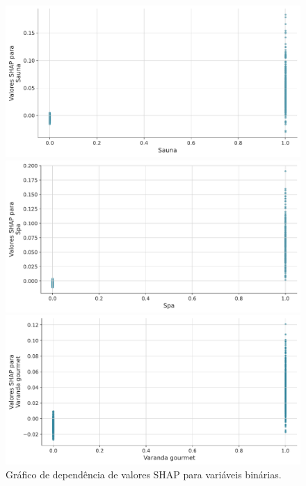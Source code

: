 \documentclass[
  12pt,
  a4paper,
]{scrreprt}
\begin{document}
\begin{figure}
\newline
\begin{minipage}{0.33\linewidth}
\includegraphics{TCC_files/mediabag/includes/dependence_plot_cat/dep_plot_sauna.pdf}\end{minipage}%
%
\begin{minipage}{0.33\linewidth}
\includegraphics{TCC_files/mediabag/includes/dependence_plot_cat/dep_plot_spa.pdf}\end{minipage}%
%
\begin{minipage}{0.33\linewidth}
\includegraphics{TCC_files/mediabag/includes/dependence_plot_cat/dep_plot_varanda_gourmet.pdf}\end{minipage}%

\caption{\label{fig-dependence_plot}Gráfico de dependência de valores
SHAP para variáveis binárias.}

\end{figure}%
\end{document}
